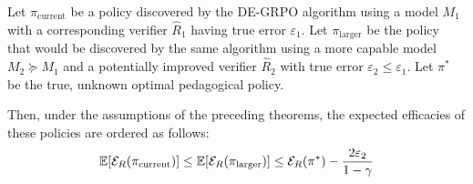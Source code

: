 \begin{corollary}
\label{cor:sandwich}
Let $\pi_{\text{current}}$ be a policy discovered by the DE-GRPO algorithm using a model $M_1$ with a corresponding verifier $\hat{R}_1$ having true error $\varepsilon_1$. Let $\pi_{\text{larger}}$ be the policy that would be discovered by the same algorithm using a more capable model $M_2 \succeq M_1$ and a potentially improved verifier $\hat{R}_2$ with true error $\varepsilon_2 \le \varepsilon_1$. Let $\pi^*$ be the true, unknown optimal pedagogical policy.

Then, under the assumptions of the preceding theorems, the expected efficacies of these policies are ordered as follows:
\[
\mathbb{E}[\mathcal{E}_R(\pi_{\text{current}})] \le \mathbb{E}[\mathcal{E}_R(\pi_{\text{larger}})] \le \mathcal{E}_R(\pi^*) - \frac{2\varepsilon_2}{1-\gamma}
\]
\end{corollary}
